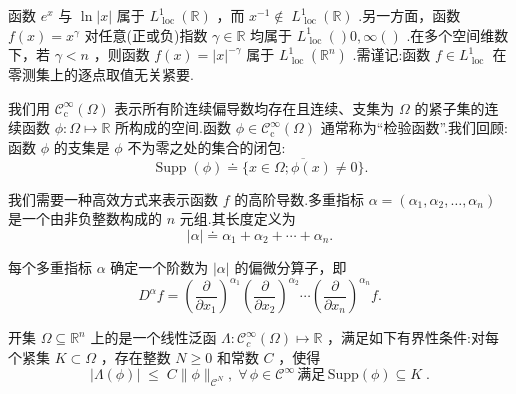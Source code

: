 \begin{instance}\label{ins:L1loc-examples}
函数 ${e}^{x}$ 与 $\ln \left| x\right|$ 属于 ${L}_{\text{ loc }}^{1}\left( \mathbb{R}\right)$ ，而 ${x}^{-1} \notin \; {L}_{\text{ loc }}^{1}\left( \mathbb{R}\right)$ .另一方面，函数 $f\left( x\right)  = {x}^{\gamma }$ 对任意(正或负)指数 $\gamma  \in  \mathbb{R}$ 均属于 ${L}_{\text{ loc }}^{1}\left(  \right)  0,\infty \left(  \right)$ .在多个空间维数下，若 $\gamma  < n$ ，则函数 $f\left( x\right)  = {\left| x\right| }^{-\gamma }$ 属于 ${L}_{\text{ loc }}^{1}\left( {\mathbb{R}}^{n}\right)$ .需谨记:函数 $f \in  {L}_{\text{ loc }}^{1}$ 在零测集上的逐点取值无关紧要.
\end{instance}

我们用 ${\mathcal{C}}_{\mathrm{c}}^{\infty }\left( \Omega \right)$ 表示所有阶连续偏导数均存在且连续、支集为 $\Omega$ 的紧子集的连续函数 $\phi  : \Omega  \mapsto  \mathbb{R}$ 所构成的空间.函数 $\phi  \in  {\mathcal{C}}_{\mathrm{c}}^{\infty }\left( \Omega \right)$ 通常称为“检验函数”.我们回顾:函数 $\phi$ 的支集是 $\phi$ 不为零之处的集合的闭包:
\[
\operatorname{Supp}\left( \phi \right)  \doteq  \overline{\{ x \in  \Omega ;\phi \left( x\right)  \neq  0\} }.
\]

我们需要一种高效方式来表示函数 $f$ 的高阶导数.多重指标 $\alpha  = \left( {{\alpha }_{1},{\alpha }_{2},\ldots ,{\alpha }_{n}}\right)$ 是一个由非负整数构成的 $n$ 元组.其长度定义为
\[
\left| \alpha \right|  \doteq  {\alpha }_{1} + {\alpha }_{2} + \cdots  + {\alpha }_{n}.
\]

每个多重指标 $\alpha$ 确定一个阶数为 $\left| \alpha \right|$ 的偏微分算子，即
\[
{D}^{\alpha }f = {\left( \frac{\partial }{\partial {x}_{1}}\right) }^{{\alpha }_{1}}{\left( \frac{\partial }{\partial {x}_{2}}\right) }^{{\alpha }_{2}}\cdots {\left( \frac{\partial }{\partial {x}_{n}}\right) }^{{\alpha }_{n}}f.
\]

\begin{definition}[分布]\label{def:distribution}
开集 $\Omega  \subseteq  {\mathbb{R}}^{n}$ 上的是一个线性泛函 $\Lambda  : {\mathcal{C}}_{c}^{\infty }\left( \Omega \right)  \mapsto  \mathbb{R}$ ，满足如下有界性条件:对每个紧集 $K \subset  \Omega$ ，存在整数 $N \geq  0$ 和常数 $C$ ，使得
\begin{equation}\tag{8.7}\label{eq:distribution-bound}
\left| {\Lambda \left( \phi \right) }\right| \; \leq  \;C\| \phi {\| }_{{\mathcal{C}}^{N}},\;\forall\,\phi  \in  {\mathcal{C}}^{\infty }\,\text{满足}\,\mathrm{{Supp}}\left( \phi \right)  \subseteq  K\;.
\end{equation}
\end{definition}

